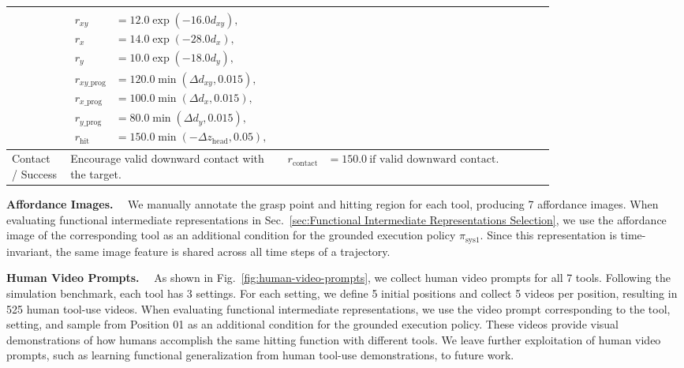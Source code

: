 \begin{table}[!h]
{\begin{tabular}{lp{0.30\linewidth}p{0.50\linewidth}}
& 
$
\begin{aligned}
r_{xy} &= 12.0\exp(-16.0 d_{xy}), \\
r_x &= 14.0\exp(-28.0 d_x), \\
r_y &= 10.0\exp(-18.0 d_y), \\
r_{xy\_\mathrm{prog}} &= 120.0\min(\Delta d_{xy}, 0.015), \\
r_{x\_\mathrm{prog}} &= 100.0\min(\Delta d_x, 0.015), \\
r_{y\_\mathrm{prog}} &= 80.0\min(\Delta d_y, 0.015), \\
r_{\mathrm{hit}} &= 150.0\min(-\Delta z_{\mathrm{head}}, 0.05),
\end{aligned}
$
\\
\midrule
Contact / Success 
& Encourage valid downward contact with the target.
& 
$
\begin{aligned}
r_{\mathrm{contact}} &= 150.0 \ \text{if valid downward contact}.
\end{aligned}
$
\\
\bottomrule
\end{tabular}
}
\end{table}

\textbf{Affordance Images.}~~ 
We manually annotate the grasp point and hitting region for each tool, producing 7 affordance images. When evaluating functional intermediate representations in Sec.~\ref{sec:Functional Intermediate Representations Selection}, we use the affordance image of the corresponding tool as an additional condition for the grounded execution policy $\pi_{\mathrm{sys1}}$. Since this representation is time-invariant, the same image feature is shared across all time steps of a trajectory.



\textbf{Human Video Prompts.}~~
As shown in Fig.~\ref{fig:human-video-prompts}, we collect human video prompts for all 7 tools. Following the simulation benchmark, each tool has 3 settings. For each setting, we define 5 initial positions and collect 5 videos per position, resulting in 525 human tool-use videos. When evaluating functional intermediate representations, we use the video prompt corresponding to the tool, setting, and sample from Position 01 as an additional condition for the grounded execution policy. These videos provide visual demonstrations of how humans accomplish the same hitting function with different tools. We leave further exploitation of human video prompts, such as learning functional generalization from human tool-use demonstrations, to future work.


